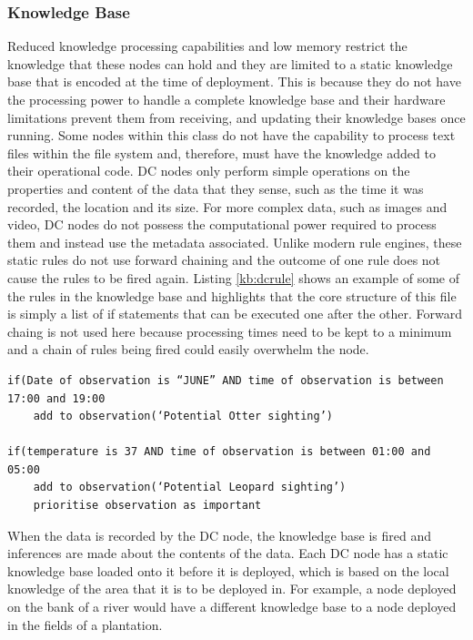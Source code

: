 	\subsubsection{Knowledge Base}
	Reduced knowledge processing capabilities and low memory restrict the knowledge that these nodes can hold and they are limited to a static knowledge base that is encoded at the time of deployment. This is because they do not have the processing power to handle a complete knowledge base and their hardware limitations prevent them from receiving, and updating their knowledge bases once running. Some nodes within this class do not have the capability to process text files within the file system and, therefore, must have the knowledge added to their operational code. DC nodes only perform simple operations on the properties and content of the data that they sense, such as the time it was recorded, the location and its size. For more complex data, such as images and video, DC nodes do not possess the computational power required to process them and instead use the metadata associated.
	Unlike modern rule engines, these static rules do not use forward chaining and the outcome of one rule does not cause the rules to be fired again. Listing \ref{kb:dcrule} shows an example of some of the rules in the knowledge base and highlights that the core structure of this file is simply a list of if statements that can be executed one after the other. Forward chaing is not used here because processing times need to be kept to a minimum and a chain of rules being fired could easily overwhelm the node. 

\begin{lstlisting}[breaklines=true, caption={Example DC Node Rules}, label={kb:dcrule}]
if(Date of observation is “JUNE” AND time of observation is between 17:00 and 19:00
	add to observation(‘Potential Otter sighting’)

if(temperature is 37 AND time of observation is between 01:00 and 05:00
	add to observation(‘Potential Leopard sighting’)
	prioritise observation as important
\end{lstlisting}

When the data is recorded by the DC node, the knowledge base is fired and inferences are made about the contents of the data. Each DC node has a static knowledge base loaded onto it before it is deployed, which is based on the local knowledge of the area that it is to be deployed in.  For example, a node deployed on the bank of a river would have a different knowledge base to a node deployed in the fields of a plantation.

